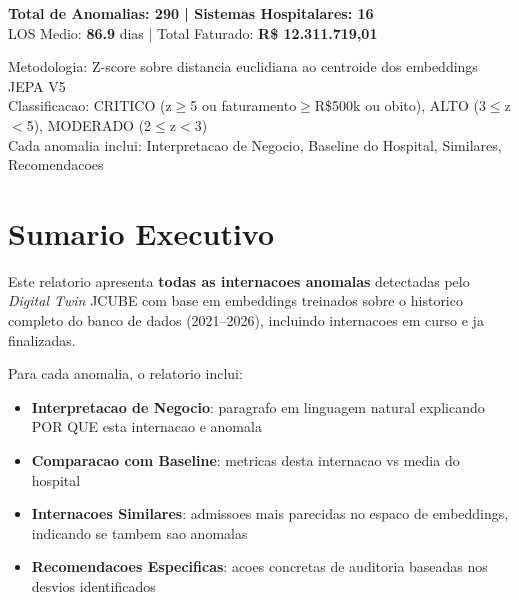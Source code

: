 \documentclass[a4paper,10pt]{article}
\begin{document}
\begin{titlepage}
\begin{center}
\vspace{0.6cm}
\begin{tcolorbox}[colback=lightblue,colframe=jcubeblue,width=0.85\textwidth,halign=center]
{\large\bfseries Total de Anomalias: 290 \quad | \quad Sistemas Hospitalares: 16}\\[4pt]

LOS Medio: \textbf{86.9} dias \quad | \quad Total Faturado: \textbf{R\$ 12.311.719,01}\\
\end{tcolorbox}

\vfill
{\small\textcolor{jcubegray}{
Metodologia: Z-score sobre distancia euclidiana ao centroide dos embeddings JEPA V5\\
Classificacao: CRITICO (z$\geq$5 ou faturamento$\geq$R\$500k ou obito),
ALTO (3$\leq$z$<$5), MODERADO (2$\leq$z$<$3)\\
Cada anomalia inclui: Interpretacao de Negocio, Baseline do Hospital, Similares, Recomendacoes
}}
\end{center}
\end{titlepage}

\tableofcontents\clearpage
\section{Sumario Executivo}

Este relatorio apresenta \textbf{todas as internacoes anomalas} detectadas pelo
\textit{Digital Twin} JCUBE com base em embeddings treinados sobre o historico completo do banco de dados (2021--2026), incluindo internacoes em curso e ja finalizadas.

Para cada anomalia, o relatorio inclui:
\begin{itemize}[nosep]
  \item \textbf{Interpretacao de Negocio}: paragrafo em linguagem natural explicando POR QUE esta internacao e anomala
  \item \textbf{Comparacao com Baseline}: metricas desta internacao vs media do hospital
  \item \textbf{Internacoes Similares}: admissoes mais parecidas no espaco de embeddings, indicando se tambem sao anomalas
  \item \textbf{Recomendacoes Especificas}: acoes concretas de auditoria baseadas nos desvios identificados
\end{itemize}
\end{document}
